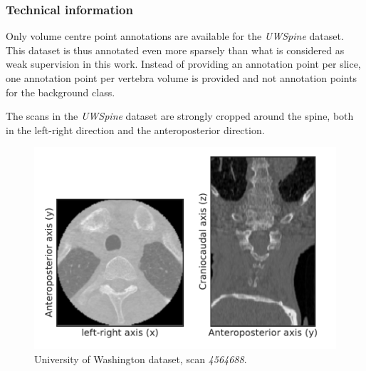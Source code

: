 \subsubsection{Technical information}

Only volume centre point annotations are available for the \textit{UWSpine} dataset. 
This dataset is thus annotated even more sparsely than what is considered as weak supervision in this work.
Instead of providing an annotation point per slice, one annotation point per vertebra volume is provided and not annotation points for the background class.

The scans in the \textit{UWSpine} dataset are strongly cropped around the spine, both in the left-right direction and the anteroposterior direction.

\begin{figure}
    \centering
    \includegraphics[width=.95\textwidth]{automated_graphs/UW_4564688.pdf}
    \caption{University of Washington dataset, scan \textit{4564688}. \label{fig:UW_4564688}}
\end{figure}

